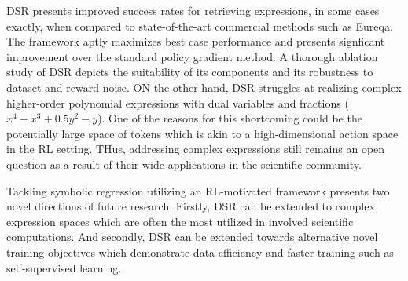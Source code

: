 \documentclass[11pt,letterpaper]{article}
\begin{document}
DSR presents improved success rates for retrieving expressions, in some cases exactly, when compared to state-of-the-art commercial methods such as Eureqa. The framework aptly maximizes best case performance and presents signficant improvement over the standard policy gradient method. A thorough ablation study of DSR depicts the suitability of its components and its robustness to dataset and reward noise. ON the other hand, DSR struggles at realizing complex higher-order polynomial expressions with dual variables and fractions ($x^{4} - x^{3} + 0.5y^{2} - y$). One of the reasons for this shortcoming could be the potentially large space of tokens which is akin to a high-dimensional action space in the RL setting. THus, addressing complex expressions still remains an open question as a result of their wide applications in the scientific community. 

Tackling symbolic regression utilizing an RL-motivated framework presents two novel directions of future research. Firstly, DSR can be extended to complex expression spaces which are often the most utilized in involved scientific computations. And secondly, DSR can be extended towards alternative novel training objectives which demonstrate data-efficiency and faster training such as self-supervised learning. 
\end{document}
